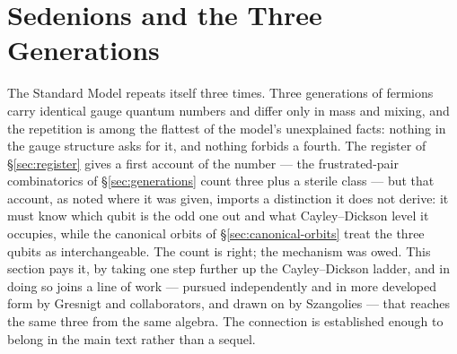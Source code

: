 %

\section{Sedenions and the Three Generations}
\label{sec:sedenions-generations}

The Standard Model repeats itself three times. Three generations of fermions carry identical gauge
quantum numbers and differ only in mass and mixing, and the repetition is among the flattest of the
model's unexplained facts: nothing in the gauge structure asks for it, and nothing forbids a fourth.
The register of \S\ref{sec:register} gives a first account of the number --- the frustrated-pair
combinatorics of \S\ref{sec:generations} count three plus a sterile class --- but that account, as
noted where it was given, imports a distinction it does not derive: it must know which qubit is the
odd one out and what Cayley--Dickson level it occupies, while the canonical orbits of
\S\ref{sec:canonical-orbits} treat the three qubits as interchangeable. The count is right; the
mechanism was owed. This section pays it, by taking one step further up the Cayley--Dickson ladder,
and in doing so joins a line of work --- pursued independently and in more developed form by
Gresnigt and collaborators, and drawn on by Szangolies --- that reaches the same three from the
same algebra. The connection is established enough to belong in the main text rather than a sequel.

